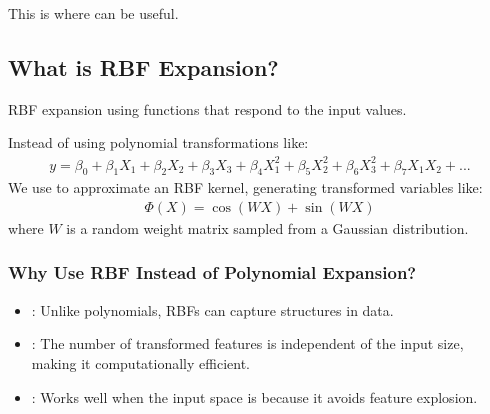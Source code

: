 \documentclass[letterpaper,10pt,english]{jupyterBook}
\begin{document}
\sphinxAtStartPar
This is where  can be useful.


\subsection{What is RBF Expansion?}
\label{\detokenize{02:what-is-rbf-expansion}}
\sphinxAtStartPar
RBF expansion  using functions that respond  to the input values.

\sphinxAtStartPar
Instead of using polynomial transformations like:
\begin{equation*}
\begin{split}
y = \beta_0 + \beta_1 X_1 + \beta_2 X_2 + \beta_3 X_3 + \beta_4 X_1^2 + \beta_5 X_2^2 + \beta_6 X_3^2 + \beta_7 X_1X_2 + ...
\end{split}
\end{equation*}
\sphinxAtStartPar
We use  to approximate an RBF kernel, generating transformed variables like:
\begin{equation*}
\begin{split}
\Phi(X) = \cos(WX) + \sin(WX)
\end{split}
\end{equation*}
\sphinxAtStartPar
where \( W \) is a random weight matrix sampled from a Gaussian distribution.


\subsubsection{Why Use RBF Instead of Polynomial Expansion?}
\label{\detokenize{02:why-use-rbf-instead-of-polynomial-expansion}}\begin{itemize}
\item {} 
\sphinxAtStartPar
{}: Unlike polynomials, RBFs can capture  structures in data.

\item {} 
\sphinxAtStartPar
{}: The number of transformed features is independent of the input size, making it computationally efficient.

\item {} 
\sphinxAtStartPar
{}: Works well when the input space is  because it avoids feature explosion.

\end{itemize}
\end{document}
